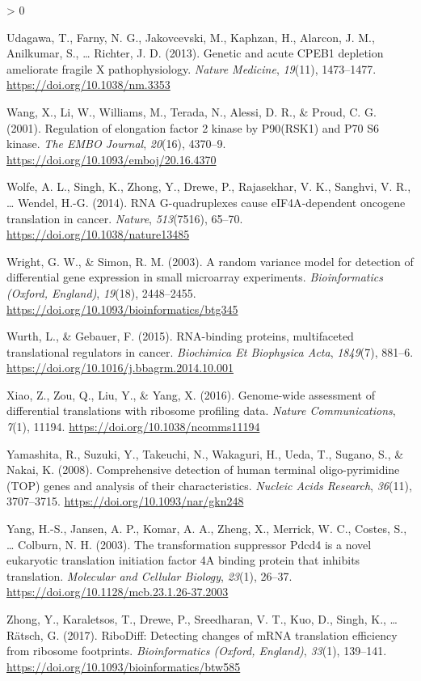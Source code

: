 \documentclass[
  12pt,
  openany]{book}
\newlength{\cslhangindent}
\newenvironment{CSLReferences}[2] %
 {%
  \setlength{\parindent}{0pt}
  \ifodd #1 \everypar{\setlength{\hangindent}{\cslhangindent}}\ignorespaces\fi
  \ifnum #2 > 0
  \setlength{\parskip}{#2\baselineskip}
  \fi
 }%
 {}
\begin{document}
\begin{CSLReferences}{1}{0}
\leavevmode\hypertarget{ref-Udagawa2013}{}%
Udagawa, T., Farny, N. G., Jakovcevski, M., Kaphzan, H., Alarcon, J. M., Anilkumar, S., \ldots{} Richter, J. D. (2013). Genetic and acute {CPEB1} depletion ameliorate fragile {X} pathophysiology. \emph{Nature Medicine}, \emph{19}(11), 1473--1477. \url{https://doi.org/10.1038/nm.3353}

\leavevmode\hypertarget{ref-Wang2001}{}%
Wang, X., Li, W., Williams, M., Terada, N., Alessi, D. R., \& Proud, C. G. (2001). Regulation of elongation factor 2 kinase by P90({RSK1}) and P70 {S6} kinase. \emph{The EMBO Journal}, \emph{20}(16), 4370--9. \url{https://doi.org/10.1093/emboj/20.16.4370}

\leavevmode\hypertarget{ref-Wolfe2014}{}%
Wolfe, A. L., Singh, K., Zhong, Y., Drewe, P., Rajasekhar, V. K., Sanghvi, V. R., \ldots{} Wendel, H.-G. (2014). {RNA G}-quadruplexes cause {eIF4A}-dependent oncogene translation in cancer. \emph{Nature}, \emph{513}(7516), 65--70. \url{https://doi.org/10.1038/nature13485}

\leavevmode\hypertarget{ref-Wright2003}{}%
Wright, G. W., \& Simon, R. M. (2003). A random variance model for detection of differential gene expression in small microarray experiments. \emph{Bioinformatics (Oxford, England)}, \emph{19}(18), 2448--2455. \url{https://doi.org/10.1093/bioinformatics/btg345}

\leavevmode\hypertarget{ref-Wurth2015}{}%
Wurth, L., \& Gebauer, F. (2015). {RNA}-binding proteins, multifaceted translational regulators in cancer. \emph{Biochimica Et Biophysica Acta}, \emph{1849}(7), 881--6. \url{https://doi.org/10.1016/j.bbagrm.2014.10.001}

\leavevmode\hypertarget{ref-Xiao2016}{}%
Xiao, Z., Zou, Q., Liu, Y., \& Yang, X. (2016). Genome-wide assessment of differential translations with ribosome profiling data. \emph{Nature Communications}, \emph{7}(1), 11194. \url{https://doi.org/10.1038/ncomms11194}

\leavevmode\hypertarget{ref-Yamashita2008}{}%
Yamashita, R., Suzuki, Y., Takeuchi, N., Wakaguri, H., Ueda, T., Sugano, S., \& Nakai, K. (2008). Comprehensive detection of human terminal oligo-pyrimidine ({TOP}) genes and analysis of their characteristics. \emph{Nucleic Acids Research}, \emph{36}(11), 3707--3715. \url{https://doi.org/10.1093/nar/gkn248}

\leavevmode\hypertarget{ref-Yang2003}{}%
Yang, H.-S., Jansen, A. P., Komar, A. A., Zheng, X., Merrick, W. C., Costes, S., \ldots{} Colburn, N. H. (2003). The transformation suppressor {Pdcd4} is a novel eukaryotic translation initiation factor {4A} binding protein that inhibits translation. \emph{Molecular and Cellular Biology}, \emph{23}(1), 26--37. \url{https://doi.org/10.1128/mcb.23.1.26-37.2003}

\leavevmode\hypertarget{ref-Zhong2017}{}%
Zhong, Y., Karaletsos, T., Drewe, P., Sreedharan, V. T., Kuo, D., Singh, K., \ldots{} Rätsch, G. (2017). {RiboDiff}: Detecting changes of {mRNA} translation efficiency from ribosome footprints. \emph{Bioinformatics (Oxford, England)}, \emph{33}(1), 139--141. \url{https://doi.org/10.1093/bioinformatics/btw585}

\end{CSLReferences}
\end{document}
